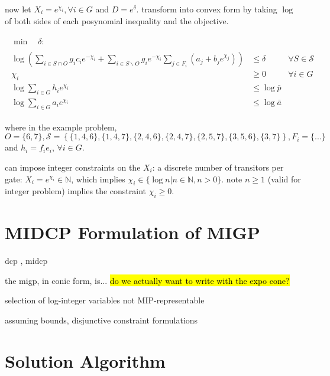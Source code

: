 \documentclass[]{article}
\begin{document}
now let $X_i = e^{\chi_i}, \forall i \in G$ and $D = e^{\delta}$. transform into convex form by taking $\log$ of both sides of each posynomial inequality and the objective.

\begin{subequations}
\begin{gather}
\begin{align}
\min \quad \delta :
\end{align}
\\
\begin{align}
\log \left( \sum_{i \in S \cap O} g_i c_i e^{-\chi_i} + \sum_{i \in S \backslash O} g_i e^{-\chi_i} \sum_{j \in F_i} \left( a_j + b_j e^{\chi_j} \right) \right)
& \leq \delta
& \forall S \in \mathcal{S}
\\
\chi_i
& \geq 0
& \forall i \in G
\\
\log \sum_{i \in G} h_i e^{\chi_i}
& \leq \log \bar{p}
\\
\log \sum_{i \in G} a_i e^{\chi_i}
& \leq \log \bar{a}
\end{align}
\end{gather}
\end{subequations}

where in the example problem, $O = \{6,7\}, \mathcal{S} = \left\{ \{1,4,6\}, \{1,4,7\}, \{2,4,6\}, \{2,4,7\}, \{2,5,7\}, \{3,5,6\}, \{3,7\} \right\}, F_i = \{...\}$ and $h_i = f_i e_i$, $\forall i \in G$.


can impose integer constraints on the $X_i$: a discrete number of transitors per gate: $X_i = e^{\chi_i} \in \mathbb{N}$, which implies $\chi_i \in \{ \log n \vert n \in \mathbb{N}, n > 0 \}$. note $n \geq 1$ (valid for integer problem) implies the constraint $\chi_i \geq 0$.



\section{MIDCP Formulation of MIGP}

dcp \cite{boyd06}, midcp \cite{lubin15}


the migp, in conic form, is... \hl{do we actually want to write with the expo cone?}



selection of log-integer variables not MIP-representable

assuming bounds, disjunctive constraint formulations



\section{Solution Algorithm}
\end{document}
